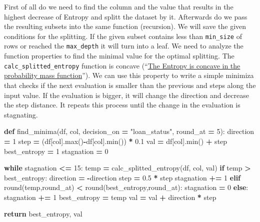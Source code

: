 \documentclass[
]{book}
\newenvironment{Shaded}{\begin{snugshade}}{\end{snugshade}}
\newcommand{\BuiltInTok}[1]{#1}
\newcommand{\ControlFlowTok}[1]{\textcolor[rgb]{0.13,0.29,0.53}{\textbf{#1}}}
\newcommand{\DecValTok}[1]{\textcolor[rgb]{0.00,0.00,0.81}{#1}}
\newcommand{\FloatTok}[1]{\textcolor[rgb]{0.00,0.00,0.81}{#1}}
\newcommand{\KeywordTok}[1]{\textcolor[rgb]{0.13,0.29,0.53}{\textbf{#1}}}
\newcommand{\NormalTok}[1]{#1}
\newcommand{\OperatorTok}[1]{\textcolor[rgb]{0.81,0.36,0.00}{\textbf{#1}}}
\newcommand{\StringTok}[1]{\textcolor[rgb]{0.31,0.60,0.02}{#1}}
\begin{document}
First of all do we need to find the column and the value that results in the highest decrease of Entropy and splitt the dataset by it. Afterwards do we pass the resulting subsets into the same function (recursion). We will save the given conditions for the splitting. If the given subset contains less than \texttt{min\_size} of rows or reached the \texttt{max\_depth} it will turn into a leaf. We need to analyze the function properties to find the minimal value for the optimal splitting. The \texttt{calc\_splitted\_entropy} function is concave (``\href{https://en.wikipedia.org/wiki/Entropy_(information_theory)}{The Entropy is concave in the probability mass function}''). We can use this property to write a simple minimiza that checks if the next evaluation is smaller than the previous and steps along the input value. If the evaluation is bigger, it will change the direction and decrease the step distance. It repeats this process until the change in the evaluation is stagnating.

\begin{Shaded}
\begin{Highlighting}[]
\KeywordTok{def}\NormalTok{ find\_minima(df, col, decision\_on }\OperatorTok{=} \StringTok{"loan\_status"}\NormalTok{, round\_at }\OperatorTok{=} \DecValTok{5}\NormalTok{):}
\NormalTok{  direction }\OperatorTok{=} \DecValTok{1}
\NormalTok{  step }\OperatorTok{=}\NormalTok{ (df[col].}\BuiltInTok{max}\NormalTok{()}\OperatorTok{{-}}\NormalTok{df[col].}\BuiltInTok{min}\NormalTok{()) }\OperatorTok{*} \FloatTok{0.1}
\NormalTok{  val }\OperatorTok{=}\NormalTok{ df[col].}\BuiltInTok{min}\NormalTok{() }\OperatorTok{+}\NormalTok{ step}
\NormalTok{  best\_entropy }\OperatorTok{=} \DecValTok{1}
\NormalTok{  stagnation }\OperatorTok{=} \DecValTok{0}
  
  \ControlFlowTok{while}\NormalTok{ stagnation }\OperatorTok{\textless{}=} \DecValTok{15}\NormalTok{:}
\NormalTok{    temp }\OperatorTok{=}\NormalTok{ calc\_splitted\_entropy(df, col, val)}
    \ControlFlowTok{if}\NormalTok{ temp }\OperatorTok{\textgreater{}}\NormalTok{ best\_entropy:}
\NormalTok{      direction }\OperatorTok{=} \OperatorTok{{-}}\NormalTok{direction}
\NormalTok{      step }\OperatorTok{=} \FloatTok{0.5} \OperatorTok{*}\NormalTok{ step}
\NormalTok{      stagnation }\OperatorTok{+=} \DecValTok{1}
    \ControlFlowTok{elif} \BuiltInTok{round}\NormalTok{(temp,round\_at) }\OperatorTok{\textless{}} \BuiltInTok{round}\NormalTok{(best\_entropy,round\_at):}
\NormalTok{      stagnation }\OperatorTok{=} \DecValTok{0}
    \ControlFlowTok{else}\NormalTok{:}
\NormalTok{      stagnation }\OperatorTok{+=} \DecValTok{1}
\NormalTok{    best\_entropy }\OperatorTok{=}\NormalTok{ temp}
\NormalTok{    val }\OperatorTok{=}\NormalTok{ val }\OperatorTok{+}\NormalTok{ direction }\OperatorTok{*}\NormalTok{ step}
    
  \ControlFlowTok{return}\NormalTok{ best\_entropy, val}
\end{Highlighting}
\end{Shaded}
\end{document}
